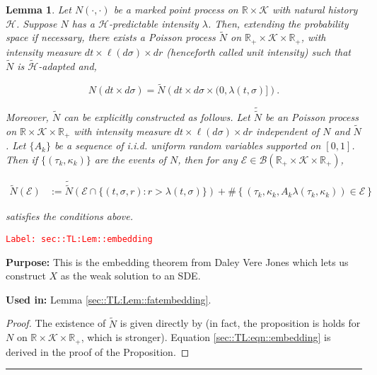 \documentclass[12pt]{article}
\newcommand{\mb}{\mathbb}
\newcommand{\mc}{\mathcal}
\newcommand{\tr}{\textcolor{red}}
\newcommand{\labe}[1]{\tr{\texttt{Label: #1}}}
\newcommand{\purpose}{\textbf{Purpose: }}
\newcommand{\usein}{\textbf{Used in: }}
\newcommand{\lin}{\rule{\linewidth}{0.4 pt}}
\newcommand{\defeq}{:=}								%
\renewcommand{\S}{S}							%
\newcommand{\s}{\sigma}							%
\renewcommand{\t}{t}							%
\newcommand{\FH}{\mc{H}}						%
\newcommand{\X}{X}								%
\newcommand{\poiss}{N}							%
\newcommand{\Sm}{\ell}							%
\newcommand{\rate}{\lambda}						%
\renewcommand{\r}{r}							%
\newcommand{\alt}[1]{\widetilde{#1}}			%
\newcommand{\indx}[1]{_{#1}}					%
\newcommand{\rt}{\tau}							%
\renewcommand{\it}{k}							%
\newcommand{\evnt}{\mc{E}}						%
\newcommand{\rv}{A}								%
\renewcommand{\mark}{\kappa}					%
\newcommand{\mspce}{\mc{K}}						%
\newtheorem{lem}[thms]{Lemma}
\begin{document}
\begin{lem}
Let \(\poiss(\cdot,\cdot)\) be a marked point process on \(\mb{R}\times \mspce\) with natural history \(\FH\). Suppose \(\poiss\) has a \(\FH\)-predictable intensity \(\rate\). Then, extending the probability space if necessary, there exists a Poisson process \(\alt{\poiss}\) on \(\mb{R}_+\times \mspce\times \mb{R}_+\), with intensity measure \(d\t\times \ell(d\s)\times d\r\) (henceforth called unit intensity) such that \(\alt{\poiss}\) is \(\alt{\FH}\)-adapted and,

\[\poiss(d\t\times d\s) = \alt{\poiss}\left(d\t\times d\s\times (0,\rate(\t,\s)]\right).\]

Moreover, \(\alt{\poiss}\) can be explicitly constructed as follows. Let \(\alt{\alt{\poiss}}\) be an Poisson process on \(\mb{R}\times \mspce\times \mb{R}_+\) with intensity measure \(d\t\times \Sm(d\s)\times d\r\) independent of \(\poiss\) and \(\alt{\poiss}\). Let \(\{\rv\indx{\it}\}\) be a sequence of i.i.d. uniform random variables supported on \([0,1]\). Then if \(\{(\rt\indx{\it},\mark\indx{\it})\}\) are the events of \(\poiss\), then for any \(\evnt \in\mc{B}(\mb{R}_+\times \mspce\times \mb{R}_+)\),

\begin{align}
\alt{N}(\evnt) &\defeq \alt{\alt{N}}\left(\evnt \cap \{(\t,\s,\r): \r > \rate(\t,\s)\}\right) + \#\left\{\left(\rt\indx{\it},\mark\indx{\it},\rv\indx{\it}\rate(\rt\indx{\it},\mark\indx{\it})\right) \in \evnt\right\}
\label{sec::TL:eqn::embedding}
\end{align}

satisfies the conditions above.

\label{sec::TL:Lem::embedding}
\end{lem}
\labe{sec::TL:Lem::embedding}

\purpose This is the embedding theorem from Daley Vere Jones which lets us construct \(\X\) as the weak solution to an SDE.

\usein Lemma \ref{sec::TL:Lem::fatembedding}.

\begin{proof}
The existence of \(\alt{\poiss}\) is given directly by \cite[Proposition 14.7.I(b)]{DalVer08} (in fact, the proposition is holds for \(\poiss\) on \(\mb{R}\times \mspce \times \mb{R}_+\), which is stronger). Equation \eqref{sec::TL:eqn::embedding} is derived in the proof of the Proposition.
\end{proof}

\lin
\end{document}
